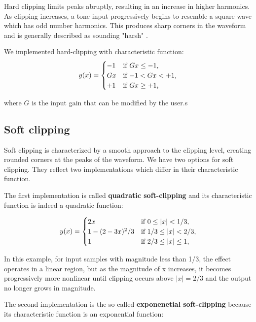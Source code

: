 \documentclass[letterpaper, 12pt]{article}
\begin{document}
	
	Hard clipping limits peaks abruptly, resulting in an increase in higher harmonics. As clipping increases, a tone input progressively begins to resemble a square wave which has odd number harmonics. This produces sharp corners in the waveform and is generally described as sounding "harsh" \cite{distortion}. 
	
	We implemented hard-clipping with characteristic function:
	\begin{equation}
		y(x) =     
		\begin{cases}
			-1 & \text{if $ Gx \leq -1 $,}\\
			Gx & \text{if $ -1 < Gx < +1 $,}\\
			+1 & \text{if $ Gx \geq +1 $,}\\
		\end{cases}       
	\end{equation}
	
	where $G$ is the input gain that can be modified by the user.s
	
	\subsection*{Soft clipping}
	
	Soft clipping is characterized by a smooth approach to the clipping level, creating rounded corners at the peaks of the waveform. We have two options for soft clipping. They reflect two implementations which differ in their characteristic function.
	
	The first implementation is called \textbf{quadratic soft-clipping} and its characteristic function is indeed a quadratic function: 
	
	\begin{equation}
		y(x) =     
		\begin{cases}
			2x & \text{if $ 0 \leq |x| < 1/3 $,}\\
			1 -(2-3x)^2 / 3& \text{if $ 1/3 \leq |x| < 2/3 $,}\\
			1 & \text{if $ 2/3 \leq |x| \leq 1 $,}\\
		\end{cases}       
	\end{equation}
	
	In this example, for input samples with magnitude less than 1/3, the
	effect operates in a linear region, but as the magnitude of x increases, it becomes progressively more nonlinear until clipping occurs above $|x| = 2/3$ and the output no longer grows in magnitude. 
	
	The second implementation is the so called \textbf{exponenetial soft-clipping} because its characteristic function is an exponential function:
	
\end{document}
